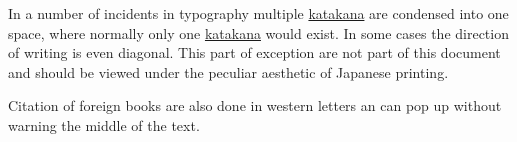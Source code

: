 
In a number of incidents in typography multiple
\hyperref[sec:Katakana]{katakana} are condensed into one space, where normally
only one \hyperref[sec:Katakana]{katakana} would exist. In some cases the
direction of writing is even diagonal. This part of exception are not part of
this document and should be viewed under the peculiar aesthetic of Japanese
printing.


Citation of foreign books are also done in western letters an can pop up
without warning the middle of the text.
